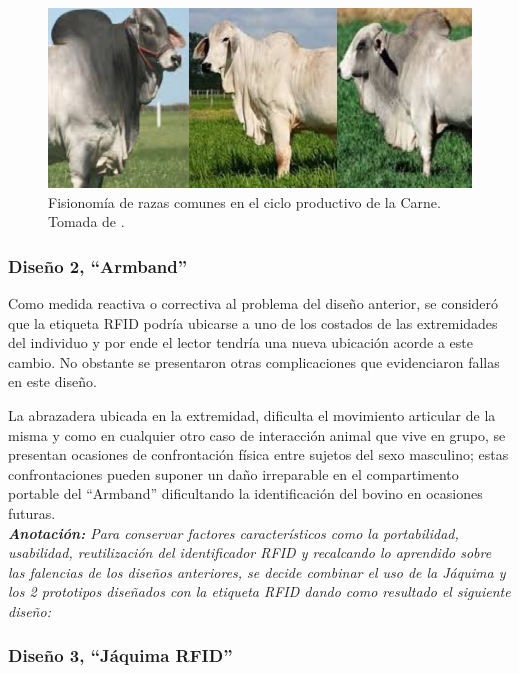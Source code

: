 		\begin{figure}[H]
		\begin{center}
			\includegraphics[scale=0.7]{img/joroba.png}
		\end{center}
		\caption{Fisionomía de razas comunes en el ciclo productivo de la Carne. Tomada de \cite{fisio1}. \label{jorobapng}}
		\end{figure}

\subsubsection{Diseño 2, ``Armband''}
Como medida reactiva o correctiva al problema del diseño anterior, se consideró que la etiqueta RFID podría ubicarse a uno de los costados de las extremidades del individuo y por ende el lector tendría una nueva ubicación acorde a este cambio. No obstante se presentaron otras complicaciones que evidenciaron fallas en este diseño.

La abrazadera ubicada en la extremidad, dificulta el movimiento articular de la misma y como en cualquier otro caso de interacción animal que vive en grupo, se presentan ocasiones de confrontación física entre sujetos del sexo masculino; estas confrontaciones pueden suponer un daño irreparable en el compartimento portable del ``Armband'' dificultando la identificación del bovino en ocasiones futuras.\\
		
		
\textit{\textbf{Anotación:} Para conservar factores característicos como la portabilidad, usabilidad, reutilización del identificador RFID y recalcando lo aprendido sobre las falencias de los diseños anteriores, se decide combinar el uso de la Jáquima y los 2 prototipos diseñados con la etiqueta RFID dando como resultado el siguiente diseño:}

\subsubsection{Diseño 3, ``Jáquima RFID''}
 
